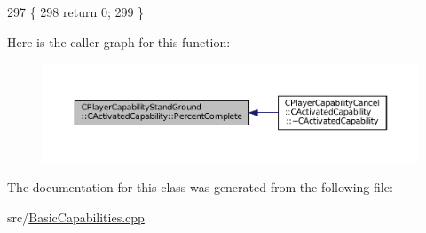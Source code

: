 \begin{DoxyCode}
297                                                                             \{
298     \textcolor{keywordflow}{return} 0;
299 \}
\end{DoxyCode}
Here is the caller graph for this function\+:
\nopagebreak
\begin{figure}[H]
\begin{center}
\leavevmode
\includegraphics[width=350pt]{classCPlayerCapabilityStandGround_1_1CActivatedCapability_aa9bf1824e755460b699d81f866f2aadc_icgraph}
\end{center}
\end{figure}


The documentation for this class was generated from the following file\+:\begin{DoxyCompactItemize}
\item 
src/\hyperlink{BasicCapabilities_8cpp}{Basic\+Capabilities.\+cpp}\end{DoxyCompactItemize}
